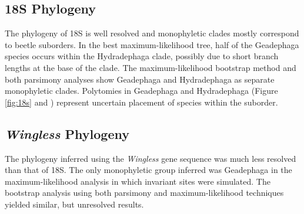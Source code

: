 \documentclass{article}\usepackage[]{graphicx}\usepackage[]{color}
\begin{document}
\subsection*{18S Phylogeny}
The phylogeny of 18S is well resolved and monophyletic clades mostly correspond to beetle suborders.
In the best maximum-likelihood tree, half of the Geadephaga species occurs within the Hydradephaga clade, possibly due to short branch lengths at the base of the clade. The maximum-likelihood bootstrap method and both parsimony analyses show Geadephaga and Hydradephaga as separate monophyletic clades.
Polytomies in Geadephaga and Hydradephaga (Figure \ref{fig:18s}  and ) represent uncertain placement of species within the suborder. 

\subsection*{\textit{Wingless} Phylogeny}
The phylogeny inferred using the \textit{Wingless} gene sequence was much less resolved than that of 18S.
The only monophyletic group inferred was Geadephaga in the maximum-likelihood analysis in which invariant sites were simulated.
The bootstrap analysis using both parsimony and maximum-likelihood techniques yielded similar, but unresolved results. 
\end{document}
